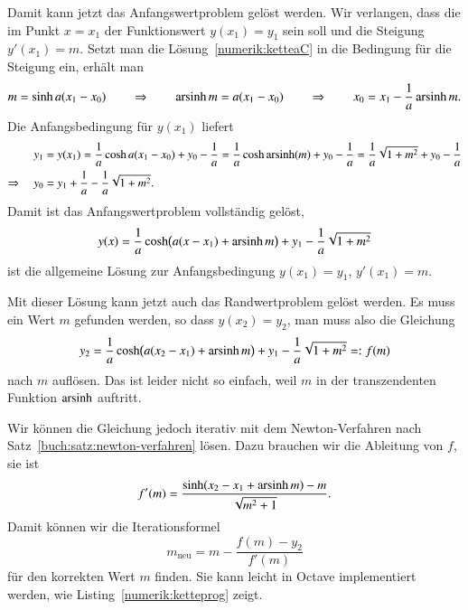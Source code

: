 \begin{loesung}
Damit kann jetzt das Anfangswertproblem gelöst werden.
%
Wir verlangen, dass die im Punkt $x=x_1$ der Funktionswert 
$y(x_1)=y_1$ sein soll und die Steigung $y'(x_1)=m$.
Setzt man die Lösung~\eqref{numerik:ketteaC} in die Bedingung
für die Steigung ein, erhält man
\[
m=\sinh a(x_1-x_0)
\qquad\Rightarrow\qquad
\operatorname{arsinh} m =a(x_1-x_0)
\qquad\Rightarrow\qquad
x_0=x_1-\frac1a\operatorname{arsinh} m.
\]
Die Anfangsbedingung für $y(x_1)$ liefert
\begin{align*}
y_1
&=
y(x_1)
=
\frac1a\cosh a(x_1-x_0) + y_0 - \frac1a
=
\frac1a\cosh \operatorname{arsinh}(m)+y_0-\frac1a
=
\frac1a\sqrt{1+m^2}+y_0-\frac1a
\\
\Rightarrow\quad
y_0
&= 
y_1+\frac1a-\frac1a\sqrt{1+m^2}.
\end{align*}
Damit ist das Anfangswertproblem vollständig gelöst, 
\begin{equation}
y(x)
=
\frac1a\cosh \bigl(a(x-x_1) + \operatorname{arsinh} m\bigr)
+ y_1 - \frac1a\sqrt{1+m^2}
\end{equation}
ist die allgemeine Lösung zur Anfangsbedingung $y(x_1)=y_1$, $y'(x_1)=m$.

Mit dieser Lösung kann jetzt auch das Randwertproblem gelöst werden.
Es muss ein Wert $m$ gefunden werden, so dass $y(x_2)=y_2$,
man muss also die Gleichung
\[
y_2
=
\frac1a\cosh \bigl(a(x_2-x_1)+\operatorname{arsinh} m\bigr) + y_1 - \frac1a\sqrt{1+m^2}
=:
f(m)
\]
nach $m$ auflösen.
Das ist leider nicht so einfach, weil $m$ in der transzendenten Funktion
$\operatorname{arsinh}$ auftritt.

Wir können die Gleichung jedoch iterativ mit dem Newton-Verfahren
nach Satz~\ref{buch:satz:newton-verfahren} lösen.
%
Dazu brauchen wir die Ableitung von $f$, sie ist
\[
f'(m)
=
\frac{ \sinh (x_2-x_1+\operatorname{arsinh} m) -m}{\sqrt{m^2+1}}.
\]
Damit können wir die Iterationsformel
\[
m_{\text{neu}} = m - \frac{f(m) - y_2}{f'(m)}
\]
für den korrekten Wert $m$ finden.
Sie kann leicht in Octave implementiert werden, wie Listing~\ref{numerik:ketteprog} zeigt.


\end{loesung}
